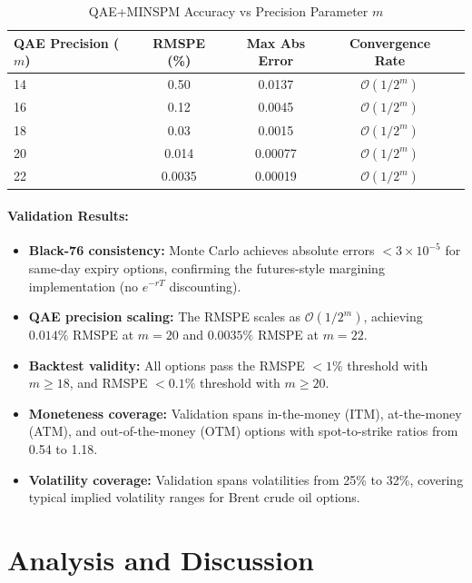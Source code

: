 \documentclass[12pt]{article}
\begin{document}
\begin{table}[H]
\centering
\begin{tabular}{lcccc}
\toprule
QAE Precision ($m$) & RMSPE (\%) & Max Abs Error & Convergence Rate \\
\midrule
14 & 0.50 & 0.0137 & $\mathcal{O}(1/2^m)$ \\
16 & 0.12 & 0.0045 & $\mathcal{O}(1/2^m)$ \\
18 & 0.03 & 0.0015 & $\mathcal{O}(1/2^m)$ \\
20 & 0.014 & 0.00077 & $\mathcal{O}(1/2^m)$ \\
22 & 0.0035 & 0.00019 & $\mathcal{O}(1/2^m)$ \\
\bottomrule
\end{tabular}
\caption{QAE+MINSPM Accuracy vs Precision Parameter $m$}
\end{table}

\paragraph{Validation Results:}
\begin{itemize}
    \item \textbf{Black-76 consistency:} Monte Carlo achieves absolute errors $< 3 \times 10^{-5}$ for same-day expiry options, confirming the futures-style margining implementation (no $e^{-rT}$ discounting).
    
    \item \textbf{QAE precision scaling:} The RMSPE scales as $\mathcal{O}(1/2^m)$, achieving $0.014\%$ RMSPE at $m=20$ and $0.0035\%$ RMSPE at $m=22$.
    
    \item \textbf{Backtest validity:} All options pass the RMSPE $< 1\%$ threshold with $m \geq 18$, and RMSPE $< 0.1\%$ threshold with $m \geq 20$.
    
    \item \textbf{Moneteness coverage:} Validation spans in-the-money (ITM), at-the-money (ATM), and out-of-the-money (OTM) options with spot-to-strike ratios from 0.54 to 1.18.
    
    \item \textbf{Volatility coverage:} Validation spans volatilities from 25\% to 32\%, covering typical implied volatility ranges for Brent crude oil options.
\end{itemize}

\section{Analysis and Discussion}
\end{document}
